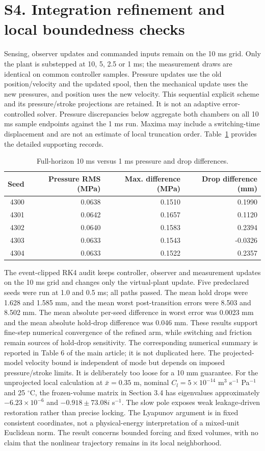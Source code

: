 \documentclass[11pt,a4paper]{article}
\begin{document}
\section*{S4. Integration refinement and local boundedness checks}
Sensing, observer updates and commanded inputs remain on the 10 ms grid. Only the plant is substepped at 10, 5, 2.5 or 1 ms; the measurement draws are identical on common controller samples. Pressure updates use the old position/velocity and the updated spool, then the mechanical update uses the new pressures, and position uses the new velocity. This sequential explicit scheme and its pressure/stroke projections are retained. It is not an adaptive error-controlled solver. Pressure discrepancies below aggregate both chambers on all 10 ms sample endpoints against the 1 ms run. Maxima may include a switching-time displacement and are not an estimate of local truncation order.
Table~\ref{supp:table:1} provides the detailed supporting records.
\begin{table}[H]\centering\caption{Full-horizon 10 ms versus 1 ms pressure and drop differences.}\label{supp:table:1}\begin{tabular}{rrrr}\toprule Seed&Pressure RMS (MPa)&Max. difference (MPa)&Drop difference (mm)\\\midrule
4300 & 0.0638 & 0.1510 & 0.1990 \\
4301 & 0.0642 & 0.1657 & 0.1120 \\
4302 & 0.0640 & 0.1583 & 0.2394 \\
4303 & 0.0633 & 0.1543 & -0.0326 \\
4304 & 0.0633 & 0.1522 & 0.2357 \\
\bottomrule\end{tabular}\end{table}
The event-clipped RK4 audit keeps controller, observer and measurement updates on the 10 ms grid and changes only the virtual-plant update. Five predeclared seeds were run at 1.0 and 0.5 ms; all paths passed. The mean hold drops were 1.628 and 1.585 mm, and the mean worst post-transition errors were 8.503 and 8.502 mm. The mean absolute per-seed difference in worst error was 0.0023 mm and the mean absolute hold-drop difference was 0.046 mm. These results support fine-step numerical convergence of the refined arm, while switching and friction remain sources of hold-drop sensitivity.
The corresponding numerical summary is reported in Table 6 of the main article; it is not duplicated here.
The projected-model velocity bound is independent of mode but depends on imposed pressure/stroke limits. It is deliberately too loose for a 10 mm guarantee. For the unprojected local calculation at $\bar x=0.35$ m, nominal $C_l=5\times10^{-14}$ m$^3$ s$^{-1}$ Pa$^{-1}$ and 25 $^\circ$C, the frozen-volume matrix in Section 3.4 has eigenvalues approximately $-6.23\times10^{-6}$ and $-0.918\pm73.08i$ s$^{-1}$. The slow pole exposes weak leakage-driven restoration rather than precise locking. The Lyapunov argument is in fixed consistent coordinates, not a physical-energy interpretation of a mixed-unit Euclidean norm. The result concerns bounded forcing and fixed volumes, with no claim that the nonlinear trajectory remains in its local neighborhood.
\end{document}
